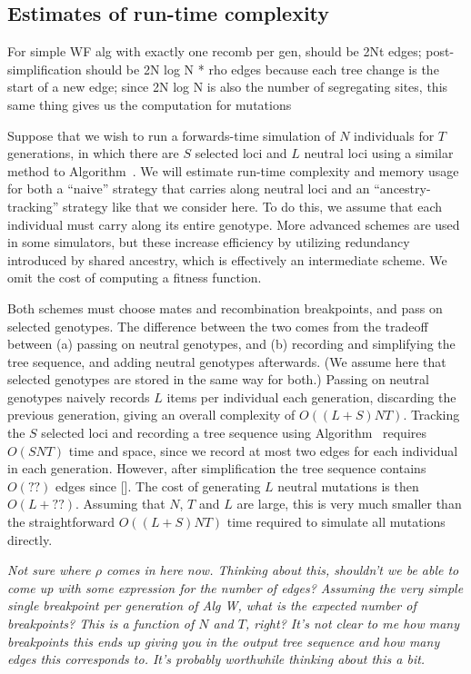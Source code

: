 \documentclass{article}
\newcommand{\jk}[1]{{\em \color{red} #1}}
\begin{document}
\subsection*{Estimates of run-time complexity}

For simple WF alg with exactly one recomb per gen, should be 2Nt edges; post-simplification should be 2N log N * rho edges
because each tree change is the start of a new edge;
since 2N log N is also the number of segregating sites, this same thing gives us the computation for mutations



Suppose that we wish to run a forwards-time simulation of $N$ individuals for $T$ generations,
in which there are $S$ selected loci and $L$ neutral loci using a similar
method to Algorithm~.
We will estimate run-time complexity and memory usage for both a ``naive'' strategy that carries along neutral loci
and an ``ancestry-tracking'' strategy like that we consider here.
To do this, we assume that each individual must carry along its entire genotype.
More advanced schemes are used in some simulators,
but these increase efficiency by utilizing redundancy introduced by shared ancestry,
which is effectively an intermediate scheme.
We omit the cost of computing a fitness function.

Both schemes must choose mates and recombination breakpoints,
and pass on selected genotypes.
The difference between the two comes from the tradeoff between
(a) passing on neutral genotypes, and
(b) recording and simplifying the tree sequence, and adding neutral genotypes afterwards.
(We assume here that selected genotypes are stored in the same way for both.)
Passing on neutral genotypes naively records $L$ items per individual each
generation, discarding the previous generation, giving an overall complexity of
$O((L + S) NT)$. Tracking the $S$ selected loci and recording a tree sequence
using Algorithm~ requires $O(SNT)$ time and space, since we
record at most two edges for each individual in each generation.
However, after simplification the tree sequence contains
$O(??)$ edges since []. The cost of generating $L$ neutral mutations
is then $O(L + ??)$. Assuming that $N$, $T$ and $L$ are large, this is
very much smaller than the straightforward $O((L + S) NT)$ time required
to simulate all mutations directly.

\jk{Not sure where $\rho$ comes in here now. Thinking about this, shouldn't we
be able to come up with some expression for the number of edges? Assuming
the very simple single breakpoint per generation of Alg W, what is the
expected number of breakpoints? This is a function of $N$ and $T$, right?
It's not clear to me how many breakpoints this ends up giving you in
the output tree sequence and how many edges this corresponds to.
It's probably worthwhile thinking about this a bit.}
\end{document}
